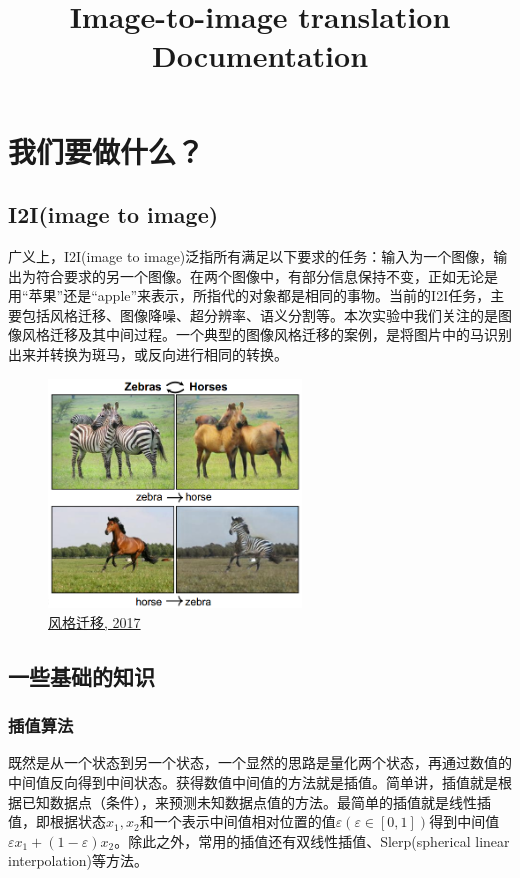 \documentclass[UTF8,a4paper，12pt]{article}
\title{Image-to-image translation Documentation}
\author{}
\def\eps {\varepsilon}
\theoremstyle{theorem}
\theoremstyle{definition}
\begin{document}
	\maketitle
	\tableofcontents
	\newpage
	
	\section{我们要做什么？}
		\subsection{I2I(image to image)}
		
广义上，I2I(image to image)泛指所有满足以下要求的任务：输入为一个图像，输出为符合要求的另一个图像。在两个图像中，有部分信息保持不变，正如无论是用“苹果”还是“apple”来表示，所指代的对象都是相同的事物。当前的I2I任务，主要包括风格迁移、图像降噪、超分辨率、语义分割等。本次实验中我们关注的是图像风格迁移及其中间过程。一个典型的图像风格迁移的案例，是将图片中的马识别出来并转换为斑马，或反向进行相同的转换。

\begin{figure}[htbp]
	\centering
	\includegraphics[width=0.6\textwidth]{assets/01}
	\caption{\href{https://arxiv.org/abs/1703.10593}{风格迁移, 2017}}
\end{figure}

		\subsection{一些基础的知识}
\subsubsection{插值算法}

既然是从一个状态到另一个状态，一个显然的思路是量化两个状态，再通过数值的中间值反向得到中间状态。获得数值中间值的方法就是插值。简单讲，插值就是根据已知数据点（条件），来预测未知数据点值的方法。最简单的插值就是线性插值，即根据状态$x_1, x_2$和一个表示中间值相对位置的值$\eps ( \eps \in [0, 1])$得到中间值$\eps x_1+(1-\eps)x_2$。除此之外，常用的插值还有双线性插值、Slerp(spherical linear interpolation)等方法。
\end{document}
